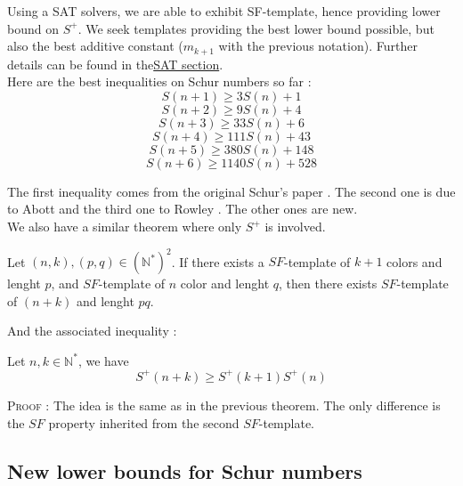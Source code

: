 Using a SAT solvers, we are able to exhibit SF-template, hence providing lower bound on \(S^+\). 
We seek templates providing the best lower bound possible, but also the best additive constant (\(m_{k+1}\) with the previous notation). 
Further details can be found in the\hyperref[SAT]{SAT section}. \\

Here are the best inequalities on Schur numbers so far :
\[ S(n+1) \geqslant 3S(n) + 1 \]
\[ S(n+2) \geqslant 9S(n) + 4 \]
\[ S(n+3) \geqslant 33S(n) + 6 \]
\[ S(n+4) \geqslant 111S(n) + 43 \]
\[ S(n+5) \geqslant 380S(n) + 148 \]
\[ S(n+6) \geqslant 1140S(n) + 528 \]

The first inequality comes from the original Schur's paper \cite{Schur1917}. The second one is due to
Abott \cite{AbbottHanson}
and the third one to Rowley \cite{RowleyRamsey}. The other ones are new. \\

We also have a similar theorem where only \(S^+\) is involved.

\begin{theorem}
	Let \((n,k), (p,q) \in (\mathbb{N}^*)^2\). If there exists a \(SF\)-template of \(k+1\) colors and lenght \(p\),
	and \(SF\)-template of \(n\) color and lenght \(q\), then there exists \(SF\)-template of \((n+k)\) and lenght \(pq\).
\end{theorem}

And the associated inequality :

\begin{corollary}
	Let \(n, k \in \mathbb{N}^*\), we have \\
	\[ S^+(n+k) \geqslant S^+(k+1)S^+(n) \]
\end{corollary}

\textsc{Proof :} The idea is the same as in the previous theorem. The only difference is the \(SF\) property inherited 
from the second \(SF\)-template.



\subsection{New lower bounds for Schur numbers}

